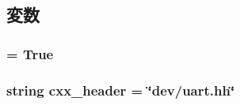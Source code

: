 \subsection{変数}
\hypertarget{classUart_1_1Uart_a17fa61ac3806b481cafee5593b55e5d0}{
\subsubsection[{abstract}]{ = True}}
\label{classUart_1_1Uart_a17fa61ac3806b481cafee5593b55e5d0}
\hypertarget{classUart_1_1Uart_a17da7064bc5c518791f0c891eff05fda}{
\subsubsection[{cxx\_\-header}]{\setlength{\rightskip}{0pt plus 5cm}string {\bf cxx\_\-header} = \char`\"{}dev/uart.hh\char`\"{}}}
\label{classUart_1_1Uart_a17da7064bc5c518791f0c891eff05fda}


